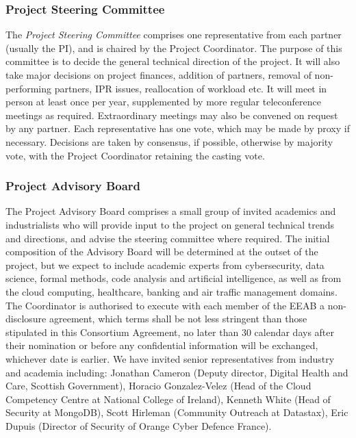 \documentclass[a4paper,11pt]{article}
\begin{document}
\subsubsection*{Project Steering Committee}
\vspace{-5pt}

The \emph{Project Steering Committee} comprises one representative from each partner
(usually the PI), and is chaired by the Project Coordinator.  
The purpose of this committee is to decide
the general technical direction of the project.  It will also
take major decisions on project finances, addition of partners, removal of non-performing
partners, IPR issues, reallocation of workload etc.  It will meet in person
at least once per year, supplemented by more regular teleconference
meetings as required. Extraordinary meetings may also be convened on request by any partner.
Each representative has one vote, which
may be made by proxy if necessary.  Decisions are taken by
consensus, if possible, otherwise by majority vote, with the
Project Coordinator retaining the casting vote.

\subsubsection*{Project Advisory Board}
\vspace{-5pt}

The Project Advisory Board comprises a small group of invited
academics and industrialists who will provide input to the
project on general technical trends and directions, and advise
the steering committee where required.  The initial composition
of the Advisory Board will be determined at the outset of the
project, but we expect to include academic experts from cybersecurity, data science, formal methods, code analysis and artificial intelligence, as well as from the cloud computing, healthcare, banking and air traffic management domains. The Coordinator is authorised to 
execute with each member of the EEAB a non-disclosure agreement, which 
terms shall be not less stringent than those stipulated in this 
Consortium Agreement, no later than 30 calendar days after their nomination 
or before any confidential information will be exchanged, whichever date is earlier. 
We have invited senior representatives from industry and academia including: Jonathan Cameron (Deputy director, Digital Health and Care, Scottish Government), Horacio Gonzalez-Velez (Head of the Cloud Competency Centre at National College of Ireland), Kenneth White (Head of Security at MongoDB), Scott Hirleman (Community Outreach at Datastax), Eric Dupuis (Director of Security of Orange Cyber Defence France).
\end{document}
